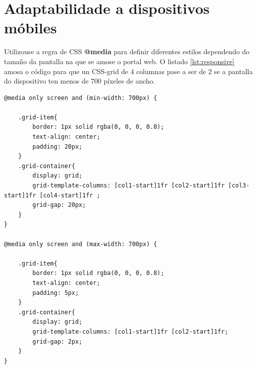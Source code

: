 \section{Adaptabilidade a dispositivos móbiles}

Utilizouse a regra de CSS \textbf{@media} para definir diferentes estilos dependendo do tamaño da pantalla na que se amose o portal web. O listado \ref{lst:responsive} amosa o código para que un CSS-grid de 4 columnas pase a ser de 2 se a pantalla do dispositivo ten menos de 700 píxeles de ancho. 

\begin{lstlisting}[caption=Extracto da folla de estilos de index.html, label=lst:responsive]
@media only screen and (min-width: 700px) {

	.grid-item{
		border: 1px solid rgba(0, 0, 0, 0.8);
		text-align: center;
		padding: 20px;
	}
	.grid-container{
		display: grid;
		grid-template-columns: [col1-start]1fr [col2-start]1fr [col3-start]1fr [col4-start]1fr ;
		grid-gap: 20px;
	}
}

@media only screen and (max-width: 700px) {

	.grid-item{
		border: 1px solid rgba(0, 0, 0, 0.8);
		text-align: center;
		padding: 5px;
	}
	.grid-container{
		display: grid;
		grid-template-columns: [col1-start]1fr [col2-start]1fr;
		grid-gap: 2px;
	}
}
\end{lstlisting}
